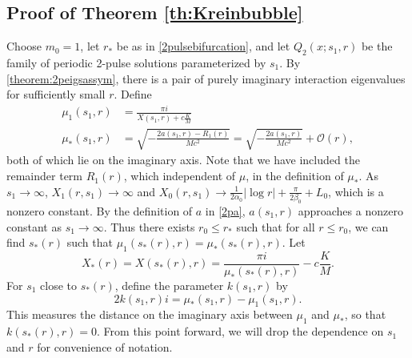 \documentclass[12pt]{elsarticle}
\theoremstyle{plain}
\theoremstyle{definition}
\theoremstyle{remark}
\numberwithin{theorem}{section}
\numberwithin{equation}{section}
\begin{document}
\subsection{Proof of Theorem \ref{th:Kreinbubble}}

Choose $m_0 = 1$, let $r_*$ be as in \cref{2pulsebifurcation}, and let $Q_2(x; s_1, r)$ be the family of periodic 2-pulse solutions parameterized by $s_1$. By \cref{theorem:2peigsassym}, there is a pair of purely imaginary interaction eigenvalues for sufficiently small $r$. Define
\begin{align*}
\mu_1(s_1, r) &= \frac{\pi i}{X(s_1,r) + c \frac{K}{M}} \\
\mu_*(s_1, r) &= \sqrt{-\frac{ 2a(s_1,r) - R_1(r) }{M c^2}} = \sqrt{-\frac{2a(s_1,r)}{M c^2}} + \mathcal{O}(r),
\end{align*}
both of which lie on the imaginary axis. Note that we have included the remainder term $R_1(r)$, which independent of $\mu$, in the definition of $\mu_*$. As $s_1 \rightarrow \infty$, $X_1(r, s_1) \rightarrow \infty$ and $X_0(r, s_1) \rightarrow \frac{1}{2 \alpha_0}|\log r| + \frac{\pi}{2\beta_0} + L_0$, which is a nonzero constant. By the definition of $a$ in \cref{2pa}, $a(s_1,r)$ approaches a nonzero constant as $s_1 \rightarrow \infty$. Thus there exists $r_0 \leq r_*$ such that for all $r \leq r_0$, we can find $s_*(r)$ such that $\mu_1(s_*(r), r) = \mu_*(s_*(r), r)$. Let
\begin{equation}\label{XstarKrein}
X_*(r) = X(s_*(r), r) = \frac{\pi i}{\mu_*(s_*(r), r)} - c \frac{K}{M}.
\end{equation}
For $s_1$ close to $s_*(r)$, define the parameter $k(s_1, r)$ by 
\[
2 k(s_1, r) i = \mu_*(s_1, r) - \mu_1(s_1, r).
\]
This measures the distance on the imaginary axis between $\mu_1$ and $\mu_*$, so that $k(s_*(r), r) = 0$. From this point forward, we will drop the dependence on $s_1$ and $r$ for convenience of notation.
\end{document}
